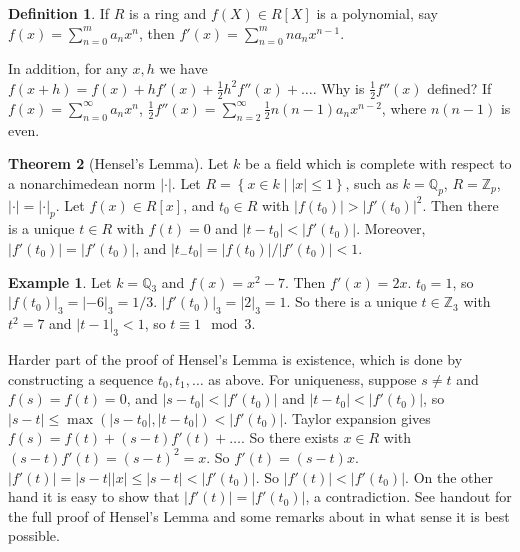 \documentclass{article}
\newcommand{\Z}{\mathbb{Z}}
\newcommand{\Q}{\mathbb{Q}}
\newcommand{\rb}[1]{\left( #1 \right)}
\renewcommand{\sb}[1]{\left[ #1 \right]}
\newcommand{\cb}[1]{\left\{ #1 \right\}}
\newcommand{\abs}[1]{\left\lvert #1 \right\rvert}
\theoremstyle{definition}\newtheorem{definition}{Definition}[section]
\theoremstyle{definition}\newtheorem{remark}[definition]{Remark}
\theoremstyle{definition}\newtheorem*{example}{Example}
\theoremstyle{definition}\newtheorem*{note}{Note}
\newtheorem{theorem}[definition]{Theorem}
\begin{document}
\begin{definition}
If $ R $ is a ring and $ f\rb{X} \in R\sb{X} $ is a polynomial, say $ f\rb{x} = \sum_{n = 0}^m a_nx^n $, then $ f'\rb{x} = \sum_{n = 0}^m na_nx^{n - 1} $.
\end{definition}

In addition, for any $ x, h $ we have $ f\rb{x + h} = f\rb{x} + hf'\rb{x} + \tfrac{1}{2}h^2f''\rb{x} + \dots $. Why is $ \tfrac{1}{2}f''\rb{x} $ defined? If $ f\rb{x} = \sum_{n = 0}^\infty a_nx^n $, $ \tfrac{1}{2}f''\rb{x} = \sum_{n = 2}^\infty \tfrac{1}{2}n\rb{n - 1}a_nx^{n - 2} $, where $ n\rb{n - 1} $ is even.

\begin{theorem}[Hensel's Lemma]
Let $ k $ be a field which is complete with respect to a nonarchimedean norm $ \abs{\cdot} $. Let $ R = \cb{x \in k \mid \abs{x} \le 1} $, such as $ k = \Q_p $, $ R = \Z_p $, $ \abs{\cdot} = \abs{\cdot}_p $. Let $ f\rb{x} \in R\sb{x} $, and $ t_0 \in R $ with $ \abs{f\rb{t_0}} > \abs{f'\rb{t_0}}^2 $. Then there is a unique $ t \in R $ with $ f\rb{t} = 0 $ and $ \abs{t - t_0} < \abs{f'\rb{t_0}} $. Moreover, $ \abs{f'\rb{t_0}} = \abs{f'\rb{t_0}} $, and $ \abs{t_- t_0} = \abs{f\rb{t_0}} / \abs{f'\rb{t_0}} < 1 $.
\end{theorem}

\begin{example}
Let $ k = \Q_3 $ and $ f\rb{x} = x^2 - 7 $. Then $ f'\rb{x} = 2x $. $ t_0 = 1 $, so $ \abs{f\rb{t_0}}_3 = \abs{-6}_3 = 1/ 3 $. $ \abs{f'\rb{t_0}}_3 = \abs{2}_3 = 1 $. So there is a unique $ t \in \Z_3 $ with $ t^2 = 7 $ and $ \abs{t - 1}_3 < 1 $, so $ t \equiv 1 \mod 3 $.
\end{example}

Harder part of the proof of Hensel's Lemma is existence, which is done by constructing a sequence $ t_0, t_1, \dots $ as above. For uniqueness, suppose $ s \ne t $ and $ f\rb{s} = f\rb{t} = 0 $, and $ \abs{s - t_0} < \abs{f'\rb{t_0}} $ and $ \abs{t - t_0} < \abs{f'\rb{t_0}} $, so $ \abs{s - t} \le \max\rb{\abs{s - t_0}, \abs{t - t_0}} < \abs{f'\rb{t_0}} $. Taylor expansion gives $ f\rb{s} = f\rb{t} + \rb{s - t}f'\rb{t} + \dots $. So there exists $ x \in R $ with $ \rb{s - t}f'\rb{t} = \rb{s - t}^2 = x $. So $ f'\rb{t} = \rb{s - t}x $. $ \abs{f'\rb{t}} = \abs{s - t}\abs{x} \le \abs{s - t} < \abs{f'\rb{t_0}} $. So $ \abs{f'\rb{t}} < \abs{f'\rb{t_0}} $. On the other hand it is easy to show that $ \abs{f'\rb{t}} = \abs{f'\rb{t_0}} $, a contradiction. See handout for the full proof of Hensel's Lemma and some remarks about in what sense it is best possible.
\end{document}
